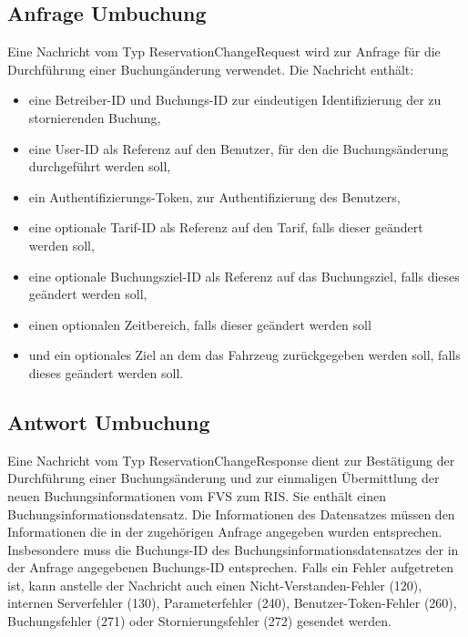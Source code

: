 

\subsection{Anfrage Umbuchung}
Eine Nachricht vom Typ ReservationChangeRequest wird zur Anfrage für die Durchführung einer Buchungänderung verwendet. Die Nachricht enthält:
\begin{itemize}
\item eine Betreiber-ID und Buchungs-ID zur eindeutigen Identifizierung der zu stornierenden Buchung,
\item eine User-ID als Referenz auf den Benutzer, für den die Buchungsänderung durchgeführt werden soll,
\item ein Authentifizierungs-Token, zur Authentifizierung des Benutzers,
\item eine optionale Tarif-ID als Referenz auf den Tarif, falls dieser geändert werden soll,
\item eine optionale Buchungsziel-ID als Referenz auf das Buchungsziel, falls dieses geändert werden soll,
\item einen optionalen Zeitbereich, falls dieser geändert werden soll
\item und ein optionales Ziel an dem das Fahrzeug zurückgegeben werden soll, falls dieses geändert werden soll.
\end{itemize}



\subsection{Antwort Umbuchung}
Eine Nachricht vom Typ ReservationChangeResponse dient zur Bestätigung der Durchführung einer Buchungsänderung und zur einmaligen Übermittlung der neuen Buchungsinformationen vom FVS zum RIS. Sie enthält einen Buchungsinformationsdatensatz. Die Informationen des Datensatzes müssen den Informationen die in der zugehörigen Anfrage angegeben wurden entsprechen. Insbesondere muss die Buchungs-ID des Buchungsinformationsdatensatzes der in der Anfrage angegebenen Buchungs-ID entsprechen. Falls ein Fehler aufgetreten ist, kann anstelle der Nachricht auch einen Nicht-Verstanden-Fehler (120), internen Serverfehler (130), Parameterfehler (240), Benutzer-Token-Fehler (260), Buchungsfehler (271) oder Stornierungsfehler (272) gesendet werden.



